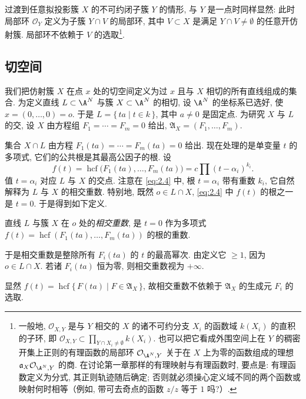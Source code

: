过渡到任意拟投影簇 $X$ 的不可约闭子簇 $Y$ 的情形, 与 $Y$ 是一点时同样显然: 此时局部环 $\mathcal O_Y$ 定义为子簇 $Y \cap V$ 的局部环, 其中 $V \subset X$ 是满足 $Y \cap V \ne \emptyset$ 的任意开仿射簇. 局部环不依赖于 $V$ 的选取\footnote{一般地, $\mathcal O_{X,Y}$ 是与 $Y$ 相交的 $X$ 的诸不可约分支 $X_i$ 的函数域 $k(X_i)$ 的直积的子环, 即 $\mathcal O_{X,Y} \subset \prod_{Y \cap X_i \ne \emptyset} k(X_i)$. 也可以把它看成外围空间上在 $Y$ 的稠密开集上正则的有理函数的局部环 $\mathcal O_{\A^N,Y}$ 关于在 $X$ 上为零的函数组成的理想 $\mathfrak a_X \mathcal O_{\A^N,Y}$ 的商. 在讨论第一章那样的有理映射与有理函数时, 要点是: 有理函数定义为分式, 其正则轨迹随后确定; 否则就必须操心定义域不同的两个函数或映射何时相等（例如, 带可去奇点的函数 $z/z$ 等于 $1$ 吗?）.}.

\subsection{切空间}

我们把仿射簇 $X$ 在点 $x$ 处的切空间定义为过 $x$ 且与 $X$ 相切的所有直线组成的集合. 为定义直线 $L \subset \A^N$ 与簇 $X \subset \A^N$ 的相切, 设 $\A^N$ 的坐标系已选好, 使 $x = (0, \ldots, 0) = o$. 于是 $L = \{\, ta \mid t \in k \,\}$, 其中 $a \ne 0$ 是固定点. 为研究 $X$ 与 $L$ 的交, 设 $X$ 由方程组 $F_1 = \cdots = F_m = 0$ 给出, $\mathfrak A_X = (F_1, \ldots, F_m)$.

集合 $X \cap L$ 由方程 $F_1(ta) = \cdots = F_m(ta) = 0$ 给出. 现在处理的是单变量 $t$ 的多项式, 它们的公共根是其最高公因子的根. 设
\begin{equation}
	\label{eq:2.4}
	f(t) = \operatorname{hcf}\bigl(F_1(ta), \ldots, F_m(ta)\bigr) = c \prod (t - \alpha_i)^{k_i}.
\end{equation}
值 $t = \alpha_i$ 对应 $L$ 与 $X$ 的交点. 注意在 \eqref{eq:2.4} 中, 根 $t = \alpha_i$ 带有重数 $k_i$, 它自然解释为 $L$ 与 $X$ 的相交重数. 特别地, 既然 $o \in L \cap X$, \eqref{eq:2.4} 中 $f(t)$ 的根之一是 $t = 0$. 于是得到如下定义.

\begin{definition}[直线与簇的相交重数]\label{def:intersection-mult-line}
	直线 $L$ 与簇 $X$ 在 $o$ 处的\emph{相交重数}, 是 $t = 0$ 作为多项式 $f(t) = \operatorname{hcf}(F_1(ta), \ldots, F_m(ta))$ 的根的重数.
\end{definition}

于是相交重数是整除所有 $F_i(ta)$ 的 $t$ 的最高幂次. 由定义它 $\ge 1$, 因为 $o \in L \cap X$. 若诸 $F_i(ta)$ 恒为零, 则相交重数视为 $+\infty$.

显然 $f(t) = \operatorname{hcf}\{\, F(ta) \mid F \in \mathfrak A_X \,\}$, 故相交重数不依赖于 $\mathfrak A_X$ 的生成元 $F_i$ 的选取.

